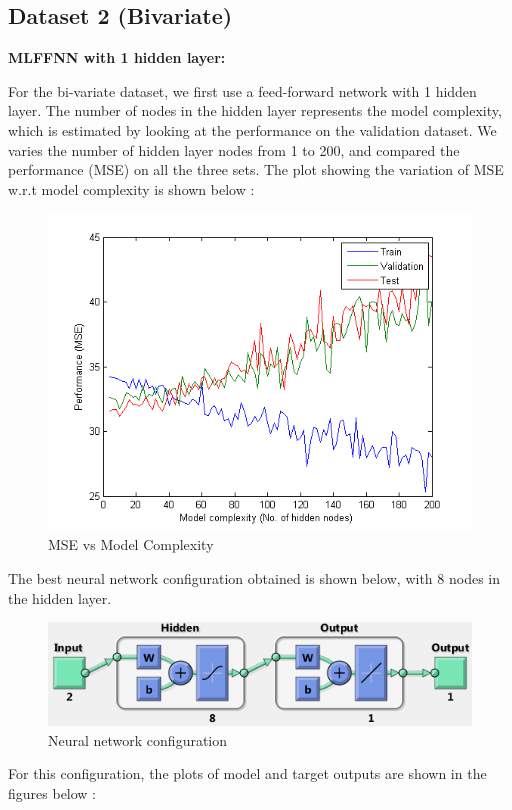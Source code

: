 \documentclass{article}
\begin{document}
\subsection{Dataset 2 (Bivariate)}

\textbf{MLFFNN with 1 hidden layer:}

For the bi-variate dataset, we first use a feed-forward network with 1 hidden layer. The number of nodes in the hidden layer represents the model complexity, which is estimated by looking at the performance on the validation dataset. We varies the number of hidden layer nodes from 1 to 200, and compared the performance (MSE) on all the three sets. The plot showing the variation of MSE w.r.t model complexity is shown below :

\begin{figure}[H]
\centering
\includegraphics[width=0.8\linewidth]{Regression/bivariate/1layer_mse.png}
\caption{MSE vs Model Complexity}
\end{figure}

The best neural network configuration obtained is shown below, with 8 nodes in the hidden layer.

\begin{figure}[H]
\centering
\includegraphics[width=\linewidth]{Regression/bivariate/net_config.png}
\caption{Neural network configuration}
\end{figure}

For this configuration, the plots of model and target outputs are shown in the figures below : 
\end{document}
